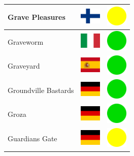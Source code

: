 \documentclass[12pt, a4paper, twoside]{report}
\begin{document}
\begin{center}
\begin{longtable}{|p{5cm}|p{2cm}|p{2cm}|}
 Grave Pleasures                                            & \includegraphics[width=1cm]{../4x3/fi} &   \includegraphics[width=1cm]{../likes/m} \\ \hline
 Graveworm                                                  & \includegraphics[width=1cm]{../4x3/it} &   \includegraphics[width=1cm]{../likes/y} \\ \hline
 Graveyard                                                  & \includegraphics[width=1cm]{../4x3/es} &   \includegraphics[width=1cm]{../likes/y} \\ \hline
 Groundville Bastards                                       & \includegraphics[width=1cm]{../4x3/de} &   \includegraphics[width=1cm]{../likes/y} \\ \hline
 Groza                                                      & \includegraphics[width=1cm]{../4x3/de} &   \includegraphics[width=1cm]{../likes/y} \\ \hline
 Guardians Gate                                             & \includegraphics[width=1cm]{../4x3/de} &   \includegraphics[width=1cm]{../likes/m} \\ \hline

\end{longtable}
\end{center}
\end{document}
